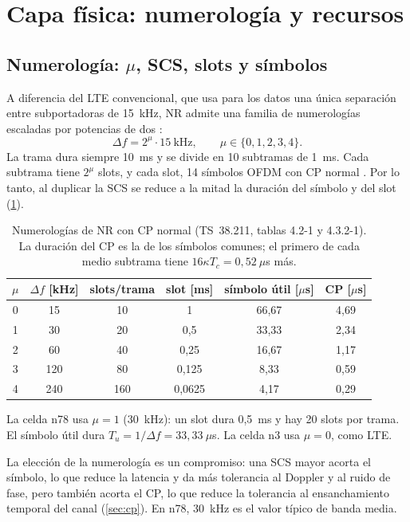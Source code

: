 \section{Capa física: numerología y recursos}\label{sec:numerologia}

\subsection{Numerología: \texorpdfstring{$\mu$}{mu}, SCS, slots y símbolos}
A diferencia del LTE convencional, que usa para los datos una única separación entre subportadoras de 15~kHz, NR admite una familia de numerologías escaladas por potencias de dos \cite[§4.2]{ts38211}:
\begin{equation}
\Delta f = 2^{\mu}\cdot 15~\text{kHz}, \qquad \mu \in \{0,1,2,3,4\}.
\label{eq:scs}
\end{equation}
La trama dura siempre 10~ms y se divide en 10 subtramas de 1~ms. Cada subtrama tiene $2^\mu$ slots, y cada slot, 14 símbolos OFDM con CP normal \cite[§4.3.1, tabla~4.3.2-1]{ts38211}. Por lo tanto, al duplicar la SCS se reduce a la mitad la duración del símbolo y del slot (\cref{tab:numerologia}).

\begin{table}[htbp]
\centering
\caption{Numerologías de NR con CP normal (TS~38.211, tablas 4.2-1 y 4.3.2-1). La duración del CP es la de los símbolos comunes; el primero de cada medio subtrama tiene $16\kappa T_c = 0{,}52~\mu$s más.}
\label{tab:numerologia}
\begin{tabular}{cccccc}
\toprule
$\mu$ & $\Delta f$ [kHz] & slots/trama & slot [ms] & símbolo útil [$\mu$s] & CP [$\mu$s] \\
\midrule
0 & 15 & 10 & 1 & 66,67 & 4,69 \\
\rowcolor{azul!10} 1 & 30 & 20 & 0,5 & 33,33 & 2,34 \\
2 & 60 & 40 & 0,25 & 16,67 & 1,17 \\
3 & 120 & 80 & 0,125 & 8,33 & 0,59 \\
4 & 240 & 160 & 0,0625 & 4,17 & 0,29 \\
\bottomrule
\end{tabular}
\end{table}

La celda n78 usa $\mu=1$ (30~kHz): un slot dura 0,5~ms y hay 20 slots por trama. El símbolo útil dura $T_u = 1/\Delta f = 33{,}33~\mu$s. La celda n3 usa $\mu=0$, como LTE.

La elección de la numerología es un compromiso: una SCS mayor acorta el símbolo, lo que reduce la latencia y da más tolerancia al Doppler y al ruido de fase, pero también acorta el CP, lo que reduce la tolerancia al ensanchamiento temporal del canal (\cref{sec:cp}). En n78, 30~kHz es el valor típico de banda media.

